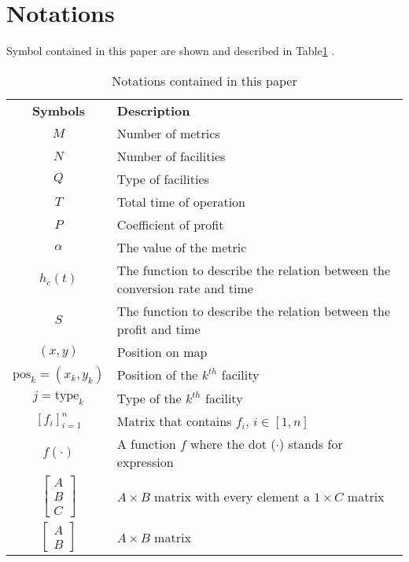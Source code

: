 \documentclass[./main.tex]{subfiles}
\begin{document}
    \section{Notations}
    Symbol contained in this paper are shown and described in Table\ref{tab:tablenotations} .
    \begin{longtable}{c l}
        \centering
        \caption{Notations contained in this paper}
        \label{tab:tablenotations}\\
        \toprule
        \textbf{Symbols} & \textbf{Description} \\ \midrule
        $M$ & Number of metrics \\[0.2cm]
        $N$ & Number of facilities \\[0.2cm]
        $Q$ & Type of facilities \\[0.2cm]
        $T$ & Total time of operation \\[0.2cm]
        $P$ & Coefficient of profit \\[0.2cm]
        $\alpha$ & The value of the metric \\[0.2cm]
        $h_c\left( t \right)$ & The function to describe the relation between the conversion rate and time \\[0.2cm]
        $S$ & The function to describe the relation between the profit and time \\[0.2cm]
        $\left( x,y \right)$ & Position on map \\[0.2cm]
        $\text{pos}_k=\left( x_k, y_k \right)$ & Position of the $k^{th}$ facility \\[0.2cm]
        $j=\mathrm{type}_k$ & Type of the $k^{th}$ facility \\[0.2cm]
        $\left[ f_i \right]_{i=1}^n$ & Matrix that contains $f_i$, $i\in \left[ 1, n \right]$ \\[0.2cm]
        $f\left( \cdot \right)$ & A function $f$ where the dot ($\cdot$) stands for expression \\[0.2cm]
        $\begin{bmatrix} A \\ B \\ C \end{bmatrix}$ & $A\times B$ matrix with every element a $1\times C$ matrix \\[0.8cm]
        $\begin{bmatrix} A \\ B \end{bmatrix}$ & $A\times B$ matrix \\[0.5cm]

\end{longtable}
\end{document}
